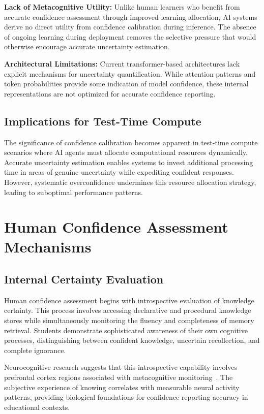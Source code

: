 \documentclass[sigconf]{acmart}
\begin{document}
\textbf{Lack of Metacognitive Utility:} Unlike human learners who benefit from accurate confidence assessment through improved learning allocation, AI systems derive no direct utility from confidence calibration during inference. The absence of ongoing learning during deployment removes the selective pressure that would otherwise encourage accurate uncertainty estimation.

\textbf{Architectural Limitations:} Current transformer-based architectures lack explicit mechanisms for uncertainty quantification. While attention patterns and token probabilities provide some indication of model confidence, these internal representations are not optimized for accurate confidence reporting.

\subsection{Implications for Test-Time Compute}

The significance of confidence calibration becomes apparent in test-time compute scenarios where AI agents must allocate computational resources dynamically. Accurate uncertainty estimation enables systems to invest additional processing time in areas of genuine uncertainty while expediting confident responses. However, systematic overconfidence undermines this resource allocation strategy, leading to suboptimal performance patterns.

\section{Human Confidence Assessment Mechanisms}

\subsection{Internal Certainty Evaluation}

Human confidence assessment begins with introspective evaluation of knowledge certainty. This process involves accessing declarative and procedural knowledge stores while simultaneously monitoring the fluency and completeness of memory retrieval. Students demonstrate sophisticated awareness of their own cognitive processes, distinguishing between confident knowledge, uncertain recollection, and complete ignorance.

Neurocognitive research suggests that this introspective capability involves prefrontal cortex regions associated with metacognitive monitoring~\cite{fleming2010knowing}. The subjective experience of knowing correlates with measurable neural activity patterns, providing biological foundations for confidence reporting accuracy in educational contexts.
\end{document}
